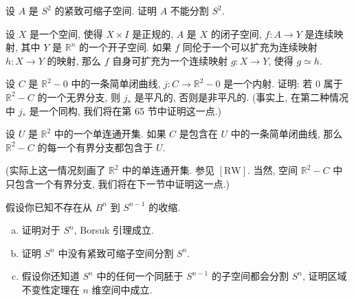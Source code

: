 \begin{exercise}\label{ch10:ex-invariance-of-domain-2}
设 $A$ 是 $S^{2}$ 的紧致可缩子空间. 证明 $A$ 不能分割 $S^{2}$.
\end{exercise}

\begin{exercise}\label{ch10:ex-invariance-of-domain-3}
设 $X$ 是一个空间, 使得 $X\times I$ 是正规的, $A$ 是 $X$ 的闭子空间, $f\colon A\to Y$ 是连续映射, 其中 $Y$ 是 $\mathbb{R}^{n}$ 的一个开子空间. 如果 $f$ 同伦于一个可以扩充为连续映射 $h\colon X\to Y$ 的映射, 那么 $f$ 自身可扩充为一个连续映射 $g\colon X\to Y$, 使得 $g\simeq h$.
\end{exercise}

\begin{exercise}\label{ch10:ex-invariance-of-domain-4}
设 $C$ 是 $\mathbb{R}^{2}-0$ 中的一条简单闭曲线, $j\colon C\to\mathbb{R}^{2}-0$ 是一个内射. 证明: 若 $0$ 属于 $\mathbb{R}^{2}-C$ 的一个无界分支, 则 $j_{*}$ 是平凡的, 否则是非平凡的. (事实上, 在第二种情况中 $j_{*}$ 是一个同构, 我们将在第 65 节中证明这一点.)
\end{exercise}

\begin{exercise}\label{ch10:ex-invariance-of-domain-5}
设 $U$ 是 $\mathbb{R}^{2}$ 中的一个单连通开集. 如果 $C$ 是包含在 $U$ 中的一条简单闭曲线, 那么 $\mathbb{R}^{2}-C$ 的每一个有界分支都包含于 $U$.

(实际上这一情况刻画了 $\mathbb{R}^{2}$ 中的单连通开集. 参见 $[\mathrm{RW}]$. 当然, 空间 $\mathbb{R}^{2}-C$ 中只包含一个有界分支, 我们将在下一节中证明这一点.)
\end{exercise}

\begin{exercise}\label{ch10:ex-invariance-of-domain-6}
假设你已知不存在从 $B^{n}$ 到 $S^{n-1}$ 的收缩.

\begin{enumerate}[(a)]
\item 证明对于 $S^{n}$, Borsuk 引理成立.
\item 证明 $S^{n}$ 中没有紧致可缩子空间分割 $S^{n}$.
\item 假设你还知道 $S^{n}$ 中的任何一个同胚于 $S^{n-1}$ 的子空间都会分割 $S^{n}$, 证明区域不变性定理在 $n$ 维空间中成立.
\end{enumerate}
\end{exercise}
